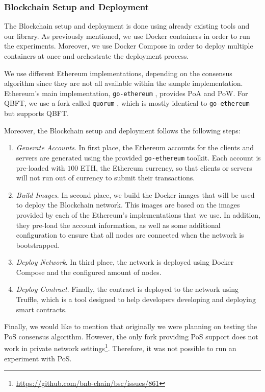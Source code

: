 \subsubsection{Blockchain Setup and Deployment}

The Blockchain setup and deployment is done using already existing tools and our library. As previously mentioned, we use Docker containers in order to run the experiments. Moreover, we use Docker Compose in order to deploy multiple containers at once and orchestrate the deployment process.

We use different Ethereum implementations, depending on the consensus algorithm since they are not all available within the sample implementation. Ethereum's main implementation, \texttt{go-ethereum} \cite{go-ethereum}, provides PoA and PoW. For QBFT, we use a fork called \texttt{quorum} \cite{quorum}, which is mostly identical to \texttt{go-ethereum} but supports QBFT.

Moreover, the Blockchain setup and deployment follows the following steps:

\begin{enumerate}
    \item \textit{Generate Accounts}. In first place, the Ethereum accounts for the clients and servers are generated using the provided \texttt{go-ethereum} toolkit. Each account is pre-loaded with $100$ ETH, the Ethereum currency, so that clients or servers will not run out of currency to submit their transactions.
    
    \item \textit{Build Images}. In second place, we build the Docker images that will be used to deploy the Blockchain network. This images are based on the images provided by each of the Ethereum's implementations that we use. In addition, they pre-load the account information, as well as some additional configuration to ensure that all nodes are connected when the network is bootstrapped.
    
    \item \textit{Deploy Network}. In third place, the network is deployed using Docker Compose and the configured amount of nodes.
    
    \item \textit{Deploy Contract}. Finally, the contract is deployed to the network using Truffle, which is a tool designed to help developers developing and deploying smart contracts.
\end{enumerate}

Finally, we would like to mention that originally we were planning on testing the PoS consensus algorithm. However, the only fork providing PoS support does not work in private network settings\footnote{\url{https://github.com/bnb-chain/bsc/issues/861}}. Therefore, it was not possible to run an experiment with PoS.

